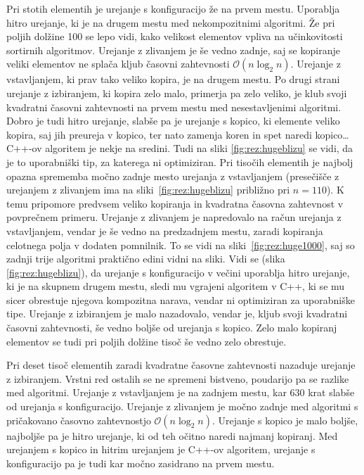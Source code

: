 \documentclass[a4paper,oneside,12pt]{article}
\begin{document}
Pri stotih elementih je urejanje s konfiguracijo že na prvem mestu. Uporablja
hitro urejanje, ki je na drugem mestu med nekompozitnimi algoritmi. Že pri
poljih dolžine 100 se lepo
vidi, kako velikost elementov vpliva na učinkovitosti sortirnih algoritmov.
Urejanje z zlivanjem je še vedno zadnje, saj se kopiranje veliki elementov ne
splača kljub časovni zahtevnosti $\mathcal{O}(n\log_2 n)$. Urejanje z
vstavljanjem, ki prav tako veliko kopira, je na drugem mestu. Po drugi strani
urejanje z izbiranjem, ki kopira zelo malo, primerja pa zelo veliko, je
klub svoji kvadratni časovni zahtevnosti na prvem mestu med nesestavljenimi
algoritmi. Dobro je tudi hitro urejanje, slabše pa je urejanje s kopico, ki
elemente veliko kopira, saj jih preureja v kopico, ter nato zamenja koren in spet
naredi kopico\dots C++-ov algoritem je nekje na sredini. Tudi na sliki
\ref{fig:rez:hugeblizu} se vidi, da je to
uporabniški tip, za katerega ni optimiziran.
Pri tisočih elementih je najbolj opazna sprememba močno zadnje mesto urejanja z
vstavljanjem (presečišče z urejanjem z zlivanjem ima na
sliki~\ref{fig:rez:hugeblizu} približno pri $n = 110$). K temu pripomore predvsem veliko kopiranja in kvadratna časovna
zahtevnost v povprečnem primeru. Urejanje z zlivanjem je napredovalo na račun
urejanja z vstavljanjem, vendar je še vedno na predzadnjem mestu, zaradi
kopiranja celotnega polja v dodaten pomnilnik. To se vidi na
sliki~\ref{fig:rez:huge1000}, saj so zadnji trije algoritmi praktično edini
vidni na sliki.
Vidi se (slika \ref{fig:rez:hugeblizu}), da urejanje s
konfiguracijo v večini uporablja hitro urejanje, ki je na skupnem drugem mestu, 
sledi mu vgrajeni algoritem v C++, ki se mu sicer obrestuje njegova kompozitna
narava, vendar ni optimiziran za uporabniške tipe. 
Urejanje z izbiranjem je malo nazadovalo, vendar je, kljub svoji kvadratni
časovni zahtevnosti, še vedno boljše od urejanja s kopico.
Zelo malo kopiranj elementov se tudi pri poljih dolžine
tisoč še vedno zelo obrestuje.

Pri deset tisoč elementih zaradi kvadratne časovne zahtevnosti nazaduje urejanje
z izbiranjem. Vrstni red ostalih se ne spremeni bistveno, poudarijo pa se
razlike med algoritmi. 
Urejanje z vstavljanjem je na zadnjem mestu, kar 630 krat slabše od urejanja s
konfiguracijo. Urejanje z zlivanjem je močno zadnje
med algoritmi s pričakovano časovno zahtevnostjo $\mathcal{O}(n\log_2n)$. 
Urejanje s kopico je malo boljše, najboljše pa je hitro urejanje, ki od teh
očitno naredi najmanj kopiranj. Med urejanjem s kopico in hitrim urejanjem je
C++-ov algoritem, urejanje s konfiguracijo pa je tudi kar močno zasidrano na
prvem mestu.
\end{document}
